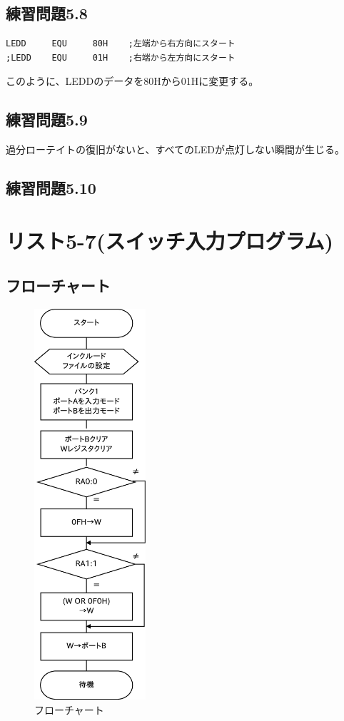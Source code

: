 \documentclass[a4paper,12pt]{ujarticle}
\begin{document}
  \subsection{練習問題5.8}
  \begin{lstlisting}[basicstyle=\ttfamily\footnotesize, frame=single]
LEDD     EQU     80H    ;左端から右方向にスタート
;LEDD    EQU     01H    ;右端から左方向にスタート
  \end{lstlisting}
  このように、LEDDのデータを80Hから01Hに変更する。
  \subsection{練習問題5.9}
  過分ローテイトの復旧がないと、すべてのLEDが点灯しない瞬間が生じる。
  \subsection{練習問題5.10}
  \clearpage
 \section{リスト5-7(スイッチ入力プログラム)}
  \subsection{フローチャート}
  \begin{figure}[htbp]
   \begin{center}
    \includegraphics[height=145mm]{Diagram5-7.eps}
   \end{center}
   \caption{フローチャート}
   \label{fig}
  \end{figure}
  \clearpage
\end{document}
